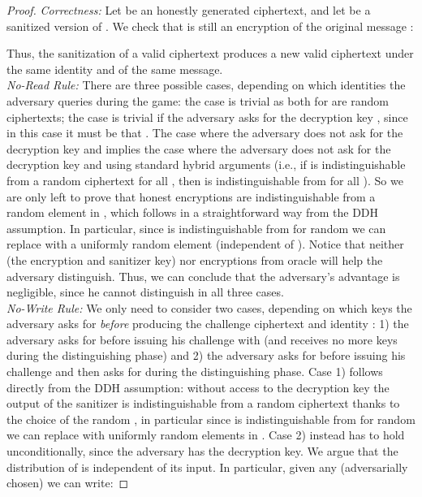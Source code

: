 \documentclass{llncs}
\begin{document}
\begin{proof}
\emph{Correctness:} 
Let   be an honestly generated ciphertext, and let  be a sanitized version of . We check that  is still an encryption of the original message :

Thus, the sanitization of a valid ciphertext produces a new valid ciphertext under the same identity and of the same message.
\\


\noindent \emph{No-Read Rule:}
There are three possible cases, depending on which identities the adversary queries during the game: the case  is trivial as both  for  are random ciphertexts; the case  is trivial if the adversary asks for the decryption key , since in this case it must be that . The case where the adversary does not ask for the decryption key and  implies the case where the adversary does not ask for the decryption key and  using standard hybrid arguments (i.e., if  is indistinguishable from a random ciphertext  for all , then  is indistinguishable from  for all ). So we are only left to prove that honest encryptions are indistinguishable from a random element in , which follows in a straightforward way from the DDH assumption. In particular, since  is indistinguishable from  for random  we can replace  with a uniformly random element (independent of ). Notice that neither  (the encryption and sanitizer key) nor encryptions from oracle  will help the adversary distinguish. 
Thus, we can conclude that the adversary's advantage is negligible, since he cannot distinguish in all three cases.
\\


\noindent \emph{No-Write Rule:}
We only need to consider two cases, depending on which keys the adversary asks for \emph{before} producing the challenge ciphertext  and identity : 1) the adversary asks for  before issuing his challenge  with  (and receives no more keys during the distinguishing phase) and 2) the adversary asks for  before issuing his challenge  and then asks for  during the distinguishing phase. Case 1) follows directly from the DDH assumption: without access to the decryption key the output of the sanitizer is indistinguishable from a random ciphertext thanks to the choice of the random , in particular since  is indistinguishable from  for random  we can replace  with uniformly random elements in . Case 2) instead has to hold unconditionally, since the adversary has the decryption key. We argue that the distribution of  is independent of its input. In particular, given any (adversarially chosen)  we can write:


\end{proof}
\end{document}
